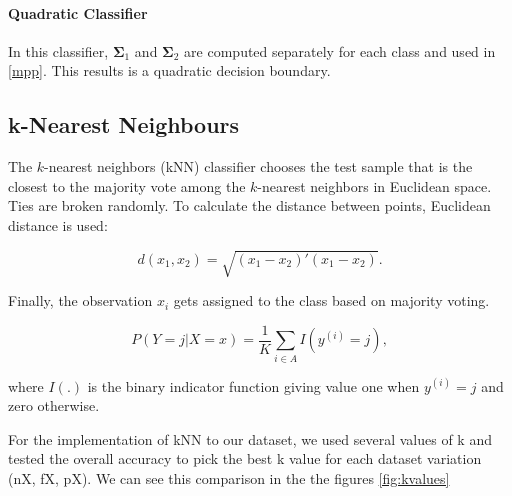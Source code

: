 \documentclass{article}
\begin{document}
\paragraph{Quadratic Classifier} In this classifier, $\boldsymbol\Sigma_1$ and  $\boldsymbol\Sigma_2$ are computed separately for each class and used in \eqref{mpp}. This results is a quadratic decision boundary.

\subsection{k-Nearest Neighbours}

The $k$-nearest neighbors (kNN) classifier chooses the test sample that is the closest to the majority vote among the $k$-nearest neighbors in Euclidean space. Ties are broken randomly.  To calculate the distance between points, Euclidean distance is used:

\begin{equation}
    d(x_1, x_2) = \sqrt{(x_1-x_2)'(x_1-x_2)}.
\end{equation}

Finally, the observation $x_i$ gets assigned to the class based on majority voting.

\begin{equation}
    P(Y = j|X = x)  = \frac{1}{K} \sum_{i \in A} I(y^{(i)} = j),
\end{equation}

where $I(.)$ is the binary indicator function giving value one when $y^{(i)} = j$ and zero otherwise.

For the implementation of kNN to our dataset, we used several values of k and tested the overall accuracy to pick the best k value for each dataset variation (nX, fX, pX). We can see this comparison in the the figures \ref{fig:kvalues}
\end{document}
